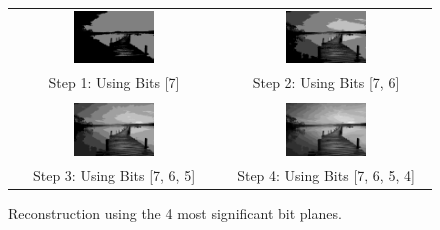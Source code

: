 \documentclass{article}
\begin{document}
\begin{figure}[H]
    \centering
    \begin{tabular}{cc}
        \includegraphics[width=0.4\textwidth]{images/reconstructed_step_1.png} &
        \includegraphics[width=0.4\textwidth]{images/reconstructed_step_2.png} \\
        Step 1: Using Bits [7] & Step 2: Using Bits [7, 6] \\
        \\
        \includegraphics[width=0.4\textwidth]{images/reconstructed_step_3.png} &
        \includegraphics[width=0.4\textwidth]{images/reconstructed_step_4.png} \\
        Step 3: Using Bits [7, 6, 5] & Step 4: Using Bits [7, 6, 5, 4] \\
    \end{tabular}
    \caption{Reconstruction using the 4 most significant bit planes.}
    \label{fig:recon1}
\end{figure}
\end{document}
